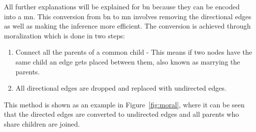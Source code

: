 \documentclass[12pt,a4paper]{article}
\begin{document}
All further explanations will be explained for \acs{bn} because they can be encoded into a \acs{mn}. This conversion from \acs{bn} to \acs{mn} involves removing the directional edges as well as making the inference more efficient. The conversion is achieved through moralization which is done in two steps:

\begin{enumerate}[label=\arabic*)]
	\item Connect all the parents of a common child - This means if two nodes have the same child an edge gets placed between them, also known as marrying the parents.
	\item All directional edges are dropped and replaced with undirected edges.
\end{enumerate}

 This method is shown as an example in Figure~\ref{fig:moral}, where it can be seen that the directed edges are converted to undirected edges and all parents who share children are joined.
\end{document}

